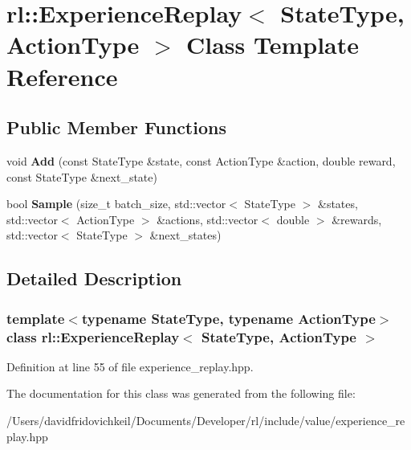 \hypertarget{classrl_1_1_experience_replay}{}\section{rl\+:\+:Experience\+Replay$<$ State\+Type, Action\+Type $>$ Class Template Reference}
\label{classrl_1_1_experience_replay}
\subsection*{Public Member Functions}
\begin{DoxyCompactItemize}
\item 
\hypertarget{classrl_1_1_experience_replay_af3a24418dda62522856af859215cb1c7}{}\label{classrl_1_1_experience_replay_af3a24418dda62522856af859215cb1c7} 
void {\bfseries Add} (const State\+Type \&state, const Action\+Type \&action, double reward, const State\+Type \&next\+\_\+state)
\item 
\hypertarget{classrl_1_1_experience_replay_a64fb838c9ecb78b5d07af4b03c654e57}{}\label{classrl_1_1_experience_replay_a64fb838c9ecb78b5d07af4b03c654e57} 
bool {\bfseries Sample} (size\+\_\+t batch\+\_\+size, std\+::vector$<$ State\+Type $>$ \&states, std\+::vector$<$ Action\+Type $>$ \&actions, std\+::vector$<$ double $>$ \&rewards, std\+::vector$<$ State\+Type $>$ \&next\+\_\+states)
\end{DoxyCompactItemize}


\subsection{Detailed Description}
\subsubsection*{template$<$typename State\+Type, typename Action\+Type$>$\newline
class rl\+::\+Experience\+Replay$<$ State\+Type, Action\+Type $>$}



Definition at line 55 of file experience\+\_\+replay.\+hpp.



The documentation for this class was generated from the following file\+:\begin{DoxyCompactItemize}
\item 
/\+Users/davidfridovichkeil/\+Documents/\+Developer/rl/include/value/experience\+\_\+replay.\+hpp\end{DoxyCompactItemize}
